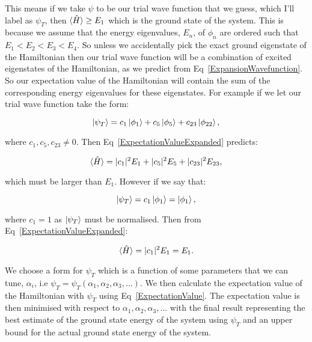\noindent This means if we take $\psi$ to be our trial wave function that we guess, which I'll label as $\psi_T$, then $\braket{\Hat{H}} \geq E_1$ which is the ground state of the system. This is because we assume that the energy eigenvalues, $E_n$, of $\phi_n$ are ordered such that $E_1 < E_2 < E_3 < E_4$. So unless we accidentally pick the exact ground eigenstate of the Hamiltonian then our trial wave function will be a combination of excited eigenstates of the Hamiltonian, as we predict from Eq~\ref{ExpansionWavefunction}. So our expectation value of the Hamiltonian will contain the sum of the corresponding energy eigenvalues for these eigenstates. For example if we let our trial wave function take the form:

\begin{equation}
    \ket{\psi_T} = c_1 \ket{\phi_1} + c_5 \ket{\phi_5} + c_{23} \ket{\phi_{22}},
    \label{Example1Wavefunction}
\end{equation}

\noindent where $c_1, c_5, c_{23} \neq 0$. Then Eq~\ref{ExpectationValueExpanded} predicts:

\begin{equation}
    \braket{\Hat{H}} = |c_1|^2 E_1 + |c_5|^2 E_5 + |c_{23}|^2 E_{23},
    \label{Example1Value}
\end{equation}

\noindent which must be larger than $E_1$. However if we say that:

\begin{equation}
    \ket{\psi_T} = c_1 \ket{\phi_1} = \ket{\phi_1},
    \label{Example2Wavefunction}
\end{equation}

\noindent where $c_1 = 1$ as $\ket{\psi_T}$ must be normalised. Then from Eq~\ref{ExpectationValueExpanded}:

\begin{equation}
    \braket{\Hat{H}} = |c_1|^2 E_1 = E_1.
    \label{Example2Value}
\end{equation}

\noindent We choose a form for $\psi_T$ which is a function of some parameters that we can tune, $\alpha_i$, i.e $\psi_T = \psi_T (\alpha_1, \alpha_2, \alpha_3, ...)$. We then calculate the expectation value of the Hamiltonian with $\psi_T$ using Eq~\ref{ExpectationValue}. The expectation value is then minimised with respect to $\alpha_1, \alpha_2, \alpha_3, ...$ with the final result representing the best estimate of the ground state energy of the system using $\psi_T$ and an upper bound for the actual ground state energy of the system.


